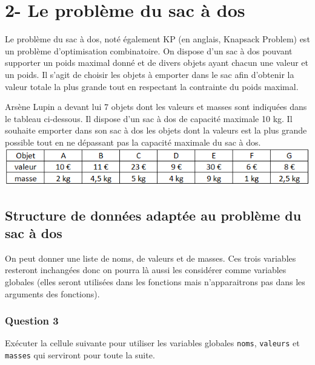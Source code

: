 \documentclass[
  paper=a4,
  ,captions=tableheading
]{scrartcl}
\begin{document}
\hypertarget{2--le-probluxe8me-du-sac-uxe0-dos}{%
\section{2- Le problème du sac à
dos}\label{2--le-probluxe8me-du-sac-uxe0-dos}}

Le problème du sac à dos, noté également KP (en anglais, Knapsack
Problem) est un problème d'optimisation combinatoire. On dispose d'un
sac à dos pouvant supporter un poids maximal donné et de divers objets
ayant chacun une valeur et un poids. Il s'agit de choisir les objets à
emporter dans le sac afin d'obtenir la valeur totale la plus grande tout
en respectant la contrainte du poids maximal.

Arsène Lupin a devant lui 7 objets dont les valeurs et masses sont
indiquées dans le tableau ci-dessous. Il dispose d'un sac à dos de
capacité maximale 10 kg. Il souhaite emporter dans son sac à dos les
objets dont la valeurs est la plus grande possible tout en ne dépassant
pas la capacité maximale du sac à dos.
\includegraphics{images/2-image.png}

\hypertarget{structure-de-donnuxe9es-adaptuxe9e-au-probluxe8me-du-sac-uxe0-dos}{%
\subsection{Structure de données adaptée au problème du sac à
dos}\label{structure-de-donnuxe9es-adaptuxe9e-au-probluxe8me-du-sac-uxe0-dos}}

On peut donner une liste de noms, de valeurs et de masses. Ces trois
variables resteront inchangées donc on pourra là aussi les considérer
comme variables globales (elles seront utilisées dans les fonctions mais
n'apparaitrons pas dans les arguments des fonctions).

\hypertarget{question-3}{%
\subsubsection{Question 3}\label{question-3}}

Exécuter la cellule suivante pour utiliser les variables globales
\texttt{noms}, \texttt{valeurs} et \texttt{masses} qui serviront pour
toute la suite.
\end{document}
